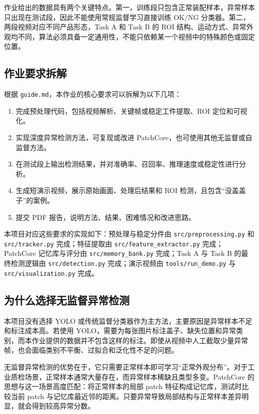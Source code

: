 \documentclass[12pt,hyperref,a4paper,UTF8,fontset=fandol]{ctexart}
\begin{document}
作业给出的数据具有两个关键特点。第一，训练段只包含正常装配样本，异常样本只出现在测试段，因此不能使用常规监督学习直接训练 OK/NG 分类器。第二，两段视频对应不同产品形态，Task A 和 Task B 的 ROI 结构、运动方式、异常外观均不同，算法必须具备一定通用性，不能只依赖某一个视频中的特殊颜色或固定位置。

\subsection{作业要求拆解}

根据 \texttt{guide.md}，本作业的核心要求可以拆解为以下几项：

\begin{enumerate}[label=\arabic*.]
    \item 完成预处理代码，包括视频解析、关键帧或稳定工件提取、ROI 定位和可视化。
    \item 实现深度异常检测方法，可复现或改进 PatchCore，也可使用其他无监督或自监督方法。
    \item 在测试段上输出检测结果，并对准确率、召回率、推理速度或稳定性进行分析。
    \item 生成短演示视频，展示原始画面、处理后结果和 ROI 检测，且包含“没盖盖子”的案例。
    \item 提交 PDF 报告，说明方法、结果、困难情况和改进思路。
\end{enumerate}

本项目对应这些要求的实现如下：预处理与稳定分件由 \texttt{src/preprocessing.py} 和 \texttt{src/tracker.py} 完成；特征提取由 \texttt{src/feature\_extractor.py} 完成；PatchCore 记忆库与评分由 \texttt{src/memory\_bank.py} 完成；Task A 与 Task B 的最终检测逻辑由 \texttt{src/detection.py} 完成；演示视频由 \texttt{tools/run\_demo.py} 与 \texttt{src/visualization.py} 完成。

\subsection{为什么选择无监督异常检测}

本项目没有选择 YOLO 或传统监督分类器作为主方法，主要原因是异常样本不足和标注成本高。若使用 YOLO，需要为每张图片标注盖子、缺失位置和异常类别，而本作业提供的数据并不包含这样的标注。即使从视频中人工截取少量异常帧，也会面临类别不平衡、过拟合和泛化性不足的问题。

无监督异常检测的优势在于，它只需要正常样本即可学习“正常外观分布”。对于工业质检场景，正常样本通常大量存在，而异常样本稀缺且类型多变。PatchCore 的思想与这一场景高度匹配：将正常样本的局部 patch 特征构成记忆库，测试时比较当前 patch 与记忆库最近邻的距离。只要异常导致局部结构与正常样本差异明显，就会得到较高异常分数。
\end{document}
